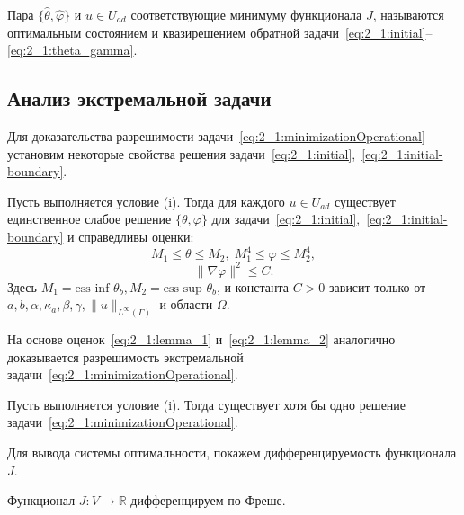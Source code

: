 Пара $\{\hat{\theta}, \hat{\varphi} \}$ и $u \in U_{ad}$ соответствующие минимуму функционала $J$,
называются оптимальным состоянием и квазирешением обратной
задачи~\eqref{eq:2_1:initial}--\eqref{eq:2_1:theta_gamma}.

\subsection{Анализ экстремальной задачи}\label{subsec:ch2/sec1/subsec3}

Для доказательства разрешимости задачи~\eqref{eq:2_1:minimizationOperational}
установим некоторые свойства решения
задачи~\eqref{eq:2_1:initial},~\eqref{eq:2_1:initial-boundary}.

\begin{lemma}
    Пусть выполняется условие (i).
    Тогда для каждого $ u \in U_{ad} $ существует единственное слабое решение
    $\{\theta, \varphi \}$ для задачи~\eqref{eq:2_1:initial},~\eqref{eq:2_1:initial-boundary}
    и справедливы оценки:
    \begin{equation}
        \label{eq:2_1:lemma_1}
        M_1 \le \theta \le M_2, \; M_1^4 \le \varphi \le M_2^4,
    \end{equation}
    \begin{equation}
        \label{eq:2_1:lemma_2}
        \| \nabla \varphi \|^2 \le C.
    \end{equation}
    Здесь $M_1 = \text{ess inf } \theta_b, M_2 = \text{ess sup } \theta_b$,
    и константа $C > 0$ зависит только от
    $a, b, \alpha, \kappa_a, \beta, \gamma, \|u\|_{L^\infty(\Gamma)}$ и области $\Omega$.
\end{lemma}

На основе оценок~\eqref{eq:2_1:lemma_1} и~\eqref{eq:2_1:lemma_2}
аналогично~\cite{Kovtanyuk2014TheoreticalAnalysis}
доказывается разрешимость экстремальной
задачи~\eqref{eq:2_1:minimizationOperational}.


\begin{theorem}
    \label{th:2_1:1}
    Пусть выполняется условие (i).
    Тогда существует хотя бы одно решение задачи~\eqref{eq:2_1:minimizationOperational}.
\end{theorem}

Для вывода системы оптимальности, покажем дифференцируемость функционала $J$.
\begin{lemma}
    \label{lm:2_1:freshet_diff}
    Функционал $J : V \rightarrow \mathbb{R}$ дифференцируем по Фреше.
\end{lemma}

